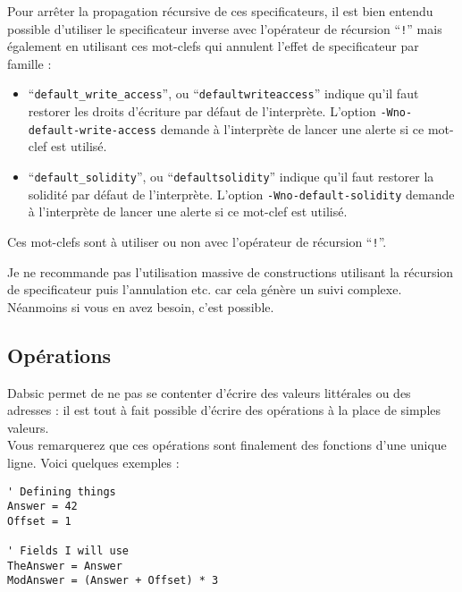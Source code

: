 \documentclass[a5paper, 12pt]{book}
\begin{document}
Pour arrêter la propagation récursive de ces specificateurs, il est
bien entendu possible d'utiliser le specificateur inverse avec
l'opérateur de récursion ``\verb|!|'' mais également en utilisant ces
mot-clefs qui annulent l'effet de specificateur par famille :\\

\begin{itemize}
  \item ``\verb!default_write_access!'', ou ``\verb!defaultwriteaccess!'' indique
    qu'il faut restorer les droits d'écriture par défaut de l'interprète.
    L'option \verb!-Wno-default-write-access! demande à l'interprète de
    lancer une alerte si ce mot-clef est utilisé.
    \vspace{\baselineskip}
  \item ``\verb!default_solidity!'', ou ``\verb!defaultsolidity!'' indique
    qu'il faut restorer la solidité par défaut de l'interprète.
    L'option \verb!-Wno-default-solidity! demande à l'interprète de
    lancer une alerte si ce mot-clef est utilisé.
    \vspace{\baselineskip}
\end{itemize}

Ces mot-clefs sont à utiliser ou non avec l'opérateur de récursion ``\verb|!|''.

Je ne recommande pas l'utilisation massive de constructions
utilisant la récursion de specificateur puis l'annulation etc. car
cela génère un suivi complexe. Néanmoins si vous en avez besoin,
c'est possible.

\newpage

\subsection{Opérations}

Dabsic permet de ne pas se contenter d'écrire des valeurs
littérales ou des adresses : il est tout à fait possible
d'écrire des opérations à la place de simples valeurs.\\

Vous remarquerez que ces opérations sont finalement des
fonctions d'une unique ligne. Voici quelques exemples :

\begin{verbatim}
' Defining things
Answer = 42
Offset = 1

' Fields I will use
TheAnswer = Answer
ModAnswer = (Answer + Offset) * 3
\end{verbatim}
\vspace{\baselineskip}
\newpage
\end{document}
